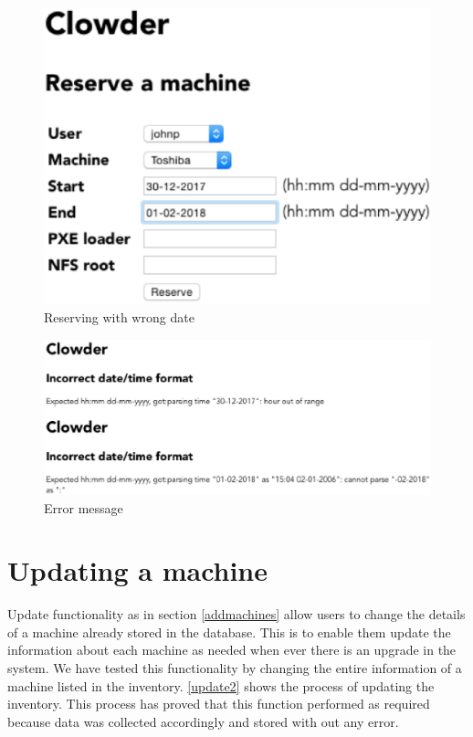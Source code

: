 \begin{figure}
\includegraphics[width=\linewidth]{dateformat1.eps}
\caption{Reserving with wrong date}
\end{figure}

\begin{figure}
\includegraphics[width=\linewidth]{dateformat2.eps}
\caption{Error message}
\label{error}
\end{figure}

\pagebreak
\section*{Updating a machine}
Update functionality as in section \ref{addmachines} allow users to change the details of a machine already stored in the database. This is to enable them update the information about each machine as needed when ever there is an upgrade in the system. We have tested this functionality by changing the entire information of a machine listed in the inventory. \autoref{update2} shows the process of updating the inventory. This process has proved that this function performed as required because data was collected accordingly and stored with out any error.


